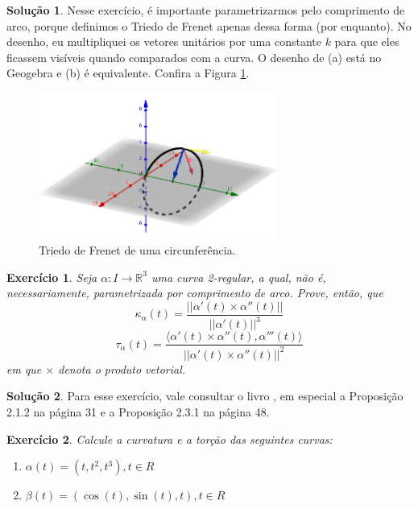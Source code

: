 \documentclass[a4paper,12pt]{article}
\newcommand{\R}{\mathbb{R}}
\theoremstyle{exer}
\newtheorem{exercise}{Exercício}
\theoremstyle{definition}
\newtheorem{solution}{Solução}
\theoremstyle{plain}
\begin{document}
\begin{solution}
    Nesse exercício, é importante parametrizarmos pelo comprimento de arco,
    porque definimos o Triedo de Frenet apenas dessa forma (por enquanto). No
    desenho, eu multipliquei os vetores unitários por uma constante $k$ para
    que eles ficassem visíveis quando comparados com a curva. O desenho de (a) está no
    Geogebra e (b) é equivalente. Confira a Figura \ref{fig-exer5}.

    \begin{figure}
        \centering
        \includegraphics[width=0.7\textwidth]{images/exer5-a.png}
        \caption{Triedo de Frenet de uma circunferência.}
        \label{fig-exer5}
    \end{figure}
\end{solution}

\begin{exercise}
    Seja $\alpha : I \to \R^3$ uma curva 2-regular, a qual, não é,
    necessariamente, parametrizada por comprimento de arco. Prove, então, que 
    $$\kappa_{\alpha}(t) = \frac{||\alpha'(t) \times \alpha''(t)||}{||\alpha'(t)||^3}$$
    $$\tau_{\alpha}(t) = \frac{\langle \alpha'(t) \times \alpha''(t),\alpha'''(t) \rangle}{||\alpha'(t) \times \alpha''(t)||^2}$$
    em que $\times$ denota o produto vetorial.
\end{exercise}

\begin{solution}
    Para esse exercício, vale consultar o livro \cite{pressley}, em especial a
    Proposição 2.1.2 na página 31 e a Proposição 2.3.1 na página 48.
\end{solution}

\begin{exercise}
    Calcule a curvatura e a torção das seguintes curvas:
    \begin{enumerate}
        \item[(a)] $\alpha(t) = (t, t^2, t^3), t \in R$
        \item[(b)] $\beta(t) = (\cos(t), \sin(t), t), t \in R$
    \end{enumerate}
\end{exercise}
\end{document}
